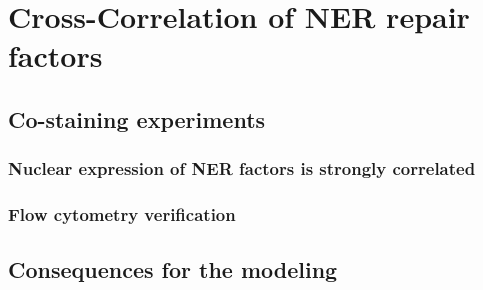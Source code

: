 \chapter{Cross-Correlation of NER repair factors}
\section{Co-staining experiments}
\subsection{Nuclear expression of NER factors is strongly correlated}
\subsection{Flow cytometry verification}

\section{Consequences for the modeling}